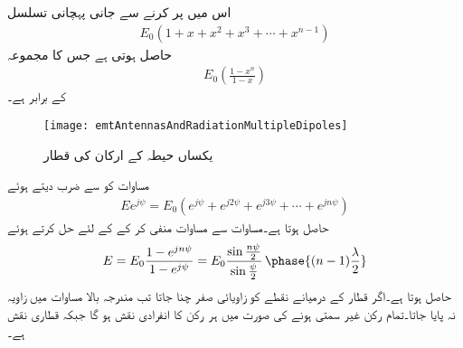اس میں  پر کرنے سے جانی پہچانی تسلسل
\begin{align*}
E_0 \left(1+x+x^2+x^3+\cdots+x^{n-1}\right)
\end{align*}
حاصل ہوتی ہے جس کا مجموعہ
\begin{align*}
E_0\left(\frac{1-x^{n}}{1-x}\right)
\end{align*}
کے برابر ہے۔

\begin{figure}
\centering
\texttt{[image: emtAntennasAndRadiationMultipleDipoles]}
\caption{یکساں حیطہ کے  ارکان کی قطار}
\label{شکل_اینٹینا_متعدد_ارکان_قطار}
\end{figure}

مساوات  کو  سے ضرب دیتے ہوئے
\begin{align}\label{مساوات_اینٹینا_یکساں_قطار_ب}
E e^{j\psi}=E_0\left(e^{j \psi}+e^{j 2 \psi}+e^{j 3 \psi} +\cdots +e^{jn\psi} \right)
\end{align}
حاصل ہوتا ہے۔مساوات  سے مساوات  منفی کر کے  کے لئے حل کرتے  ہوئے
\begin{align}
E=E_0 \frac{1-e^{j n \psi}}{1-e^{j\psi}}=E_0 \frac{\sin \frac{n\psi}{2}}{\sin \frac{\psi}{2}} \, \phase{(n-1)\frac{\lambda}{2}}
\end{align}
حاصل ہوتا ہے۔اگر قطار کے درمیانے نقطے کو زاویائی صفر چنا جاتا تب مندرجہ بالا مساوات میں زاویہ  نہ پایا جاتا۔تمام رکن غیر سمتی ہونے کی صورت میں  ہر رکن کا انفرادی نقش ہو گا جبکہ  قطاری نقش  ہے۔

